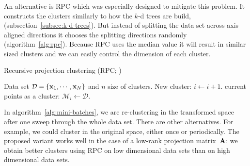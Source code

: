 \begin{description}
	An alternative is RPC which was especially designed to mitigate this problem.
It constructs the clusters similarly to how the $k$-d trees are build, (subsection~\ref{subsec:k-d-trees}). But instead of splitting the data set across axis aligned
directions it chooses the splitting directions randomly (algorithm~\ref{alg:rpc}). Because RPC uses the median value it will result in similar
sized clusters and we can easily control the dimension of each cluster. 
	
	\begin{algorithm} 
		\caption{Recursive projection clustering (RPC; \citealp{chalupka2011})} 
		\label{alg:rpc}  
		\begin{algorithmic}[1]                    %
			\REQUIRE Data set $\mathcal{D}=\{\mathbf{x}_1,\cdots,\mathbf{x}_N\}$ and $n$ size of
clusters.
				\STATE New cluster: $i\leftarrow i+1$.
				\RETURN current points as a cluster: $\mathcal{M}_i \leftarrow \mathcal{D}$.
			\ELSE
			\ENDIF
		\end{algorithmic}
	\end{algorithm}
\end{description}

	In algorithm~\ref{alg:mini-batches}, we are re-clustering in the transformed space after one sweep through
the whole data set. There are other alternatives. For example, we could
cluster in the original space, either once or periodically. The proposed variant works well in the case of a low-rank projection matrix~$\mathbf{A}$: we obtain better clusters using RPC on low dimensional data sets than on high dimensional data sets.

